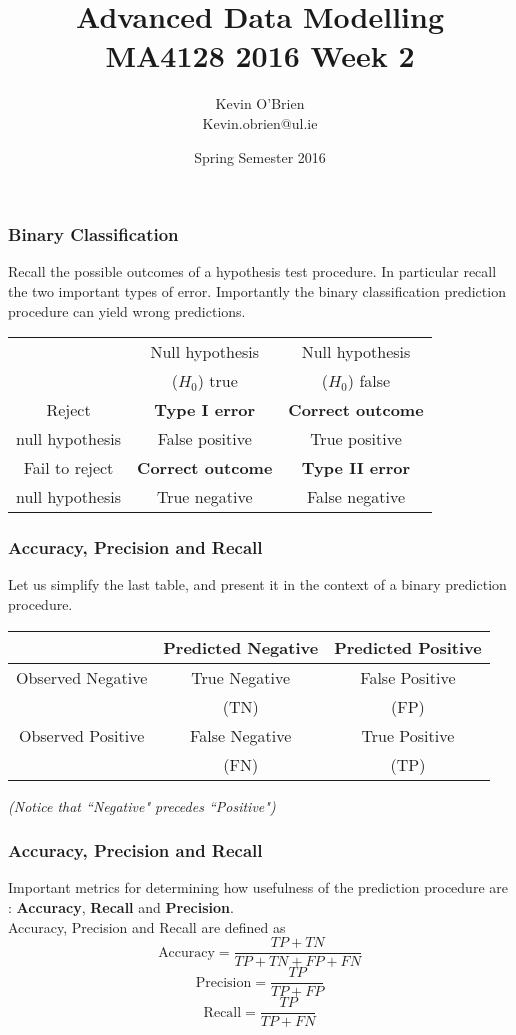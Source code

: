 \documentclass[a4]{beamer}
\title[MA4128]{Advanced Data Modelling \\ {\normalsize MA4128 2016 Week 2}}
\author[Kevin O'Brien]{Kevin O'Brien \\ {\scriptsize Kevin.obrien@ul.ie}}
\date{Spring Semester 2016}
\institute[Maths \& Stats]{Dept. of Mathematics \& Statistics, \\ University \textit{of} Limerick}
\begin{document}
\begin{frame}
\titlepage
\end{frame}
\begin{frame}
	\frametitle{Binary Classification}
	\large
	Recall the possible outcomes of a hypothesis test procedure. In particular recall the two important types of error. Importantly the binary classification prediction procedure can yield wrong predictions.
	\begin{center}
		\begin{tabular}{|c|c|c|} \hline
			& Null hypothesis & Null hypothesis   \\
			& ($H_0$) true	 & ($H_0$) false \\ \hline
			Reject 	       & \textbf{Type I error }   & \textbf{Correct outcome} \\
			null hypothesis& False positive  & True positive \\ \hline
			Fail to reject & \textbf{Correct outcome} & \textbf{Type II error} \\
			null hypothesis & True negative  & False negative \\ \hline
		\end{tabular} 
	\end{center}
\end{frame}
\begin{frame}
	\frametitle{Accuracy, Precision and Recall}
	\large
	Let us simplify the last table, and present it in the context of a binary prediction procedure.
	\begin{center}
		\begin{tabular}{|c|c|c|}
			\hline  & Predicted Negative & Predicted Positive \\ 
			\hline Observed Negative & True Negative & False Positive \\
			& (TN) & (FP)  
			\\
			\hline Observed Positive & False Negative & True Positive \\ 
			& (FN) & (TP)  \\
			\hline 
		\end{tabular} 
	\end{center}
\textit{	(Notice that ``Negative" precedes ``Positive")}
\end{frame}
\begin{frame}
	\frametitle{Accuracy, Precision and Recall}
	\large
	Important metrics for determining how usefulness of the prediction procedure are : \textbf{Accuracy}, \textbf{Recall} and \textbf{Precision}.
	\\ \bigskip
	Accuracy, Precision and Recall are defined as
	\[\mbox{Accuracy}=\frac{TP+TN}{TP+TN+FP+FN} \]
	\[\mbox{Precision}=\frac{TP}{TP+FP} \] 
	\[\mbox{Recall}=\frac{TP}{TP+FN} \]
\end{frame}
\end{document}
